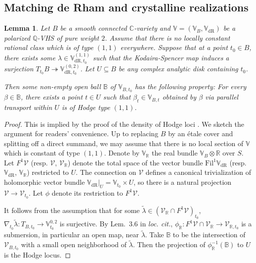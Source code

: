 \documentclass[11pt, letterpaper]{amsart}
\theoremstyle{plain}
\newtheorem{lemma}[theorem]{Lemma}
\theoremstyle{definition}
\newcommand{\IB}{\mathbb{B}}
\newcommand{\IC}{\mathbb{C}}
\newcommand{\IQ}{\mathbb{Q}}
\newcommand{\IR}{\mathbb{R}}
\newcommand{\IV}{\mathbb{V}}
\newcommand\tensor{{\otimes}}
\newcommand{\<}{\langle}
\renewcommand{\>}{\rangle}
\def\wt{\widetilde}
\newcommand{\sV}{\mathcal{V}}
\newcommand{\dR}{\mathrm{dR}}
\newcommand{\Fil}{\mathrm{Fil}}
\begin{document}
\subsection{Matching de Rham and crystalline realizations}
\label{sub:match crystalline}
\begin{lemma}
\label{lem: Voisin}
Let $B$ be a smooth connected $\IC$-variety and $\IV = (\IV_B, \IV_\dR)$ be a polarized $\IQ$-VHS of pure weight $2$. Assume that there is no locally constant rational class which is of type $(1, 1)$ everywhere. Suppose that at a point $t_0 \in B$, there exists some $\lambda \in \IV_{\dR, t_0}^{(1, 1)}$ such that the Kodaira-Spencer map induces a surjection $T_{t_0} B \twoheadrightarrow \IV_{\dR, t_0}^{(0, 2)}$. 
Let $U \subseteq B$ be any complex analytic disk containing $t_0$. 

Then some non-empty open ball $\IB$ of $\IV_{B, t_0}$ has the following property: For every $\beta \in \IB$, there exists a point $t \in U$ such that $\beta_t \in \IV_{B, t}$ obtained by $\beta$ via parallel transport within $U$ is of Hodge type $(1, 1)$.  
\end{lemma}
\begin{proof}
This is implied by the proof of the density of Hodge loci \cite[Thm~3.5]{Voisin}. We sketch the argument for readers' convenience. Up to replacing $B$ by an \'etale cover and splitting off a direct summand, we may assume that there is no local section of $\IV$ which is constant of type $(1, 1)$. Denote by $\IV_\IR$ the real bundle $\IV_B \tensor \IR$ over $S$. Let $F^1 \sV$ (resp. $\sV$, $\sV_\IR$) denote the total space of the vector bundle $\Fil^1 \IV_\dR$ (resp. $\IV_\dR$, $\IV_\IR$) restricted to $U$. The connection on $\sV$ defines a canonical trivialization of holomorphic vector bundle $\IV_\dR|_U = \IV_{t_0} \times U$, so there is a natural projection $\sV \to \sV_{t_0}$. 
Let $\phi$ denote its restriction to $F^1 \sV$. 

It follows from the assumption that for some $\wt{\lambda} \in (\sV_\IR \cap F^1 \sV)_{t_0}$, $\nabla_{t_0} \wt{\lambda} \colon T_{B, t_0} \to \IV^{0, 2}_{t_0}$ is surjective. By Lem.~3.6 in \textit{loc. cit.}, $\phi_\IR \colon F^1 \sV \cap \sV_\IR \to \sV_{\IR, t_0}$ is a submersion, in particular an open map, near $\wt{\lambda}$. Take $\IB$ to be the intersection of $\sV_{B, t_0}$ with a small open neighborhood of $\wt{\lambda}$. Then the projection of $\phi^{-1}_\IR(\IB)$ to $U$ is the Hodge locus. 
\end{proof}
\end{document}
